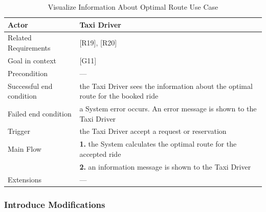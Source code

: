 \begin{table}[htbp]
\begin{center}
\begin{tabular}[t]{p{}p{}}

\hline
Actor & Taxi Driver \\
\hline
Related Requirements & [R19], [R20] \\
\hline
Goal in context & [G11] \\
\hline
Precondition & --- \\
\hline
Successful end condition & the Taxi Driver sees the information about the optimal route for the booked ride \\
\hline
Failed end condition & a System error occurs. An error message is shown to the Taxi Driver  \\
\hline
Trigger & the Taxi Driver accept a request or reservation \\
\hline
Main Flow & \textbf{1.} the System calculates the optimal route for the accepted ride \\
& \textbf{2.} an information message is shown to the Taxi Driver \\
\hline
Extensions & --- \\
\hline

\end{tabular}
\end{center}
\caption{Visualize Information About Optimal Route Use Case}
\end{table}
\clearpage

\subsubsection{Introduce Modifications}

